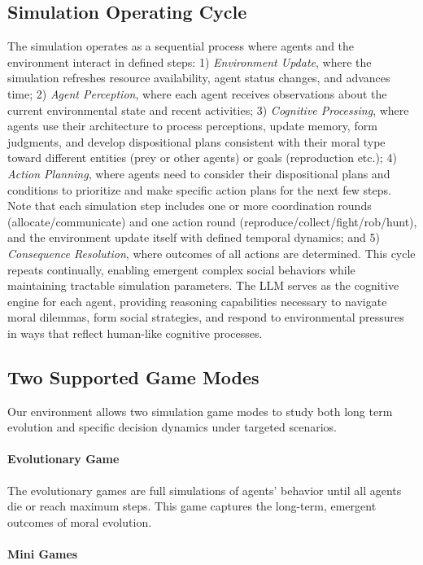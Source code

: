 \documentclass[letterpaper]{article} %
\begin{document}
\subsection{Simulation Operating Cycle} 
The simulation operates as a sequential process where agents and the environment interact in defined steps: 1) \textit{Environment Update}, where the simulation refreshes resource availability, agent status changes, and advances time; 2) \textit{Agent Perception}, where each agent receives observations about the current environmental state and recent activities; 3) \textit{Cognitive Processing}, where agents use their architecture to process perceptions, update memory, form judgments, and develop dispositional plans consistent with their moral type toward different entities (prey or other agents) or goals (reproduction etc.); 4) \textit{Action Planning}, where agents need to consider their dispositional plans and conditions to prioritize and make specific action plans for the next few steps. Note that each simulation step includes one or more coordination rounds (allocate/communicate) and one action round (reproduce/collect/fight/rob/hunt), and the environment update itself with defined temporal dynamics; and 5) \textit{Consequence Resolution}, where outcomes of all actions are determined. This cycle repeats continually, enabling emergent complex social behaviors while maintaining tractable simulation parameters. The LLM serves as the cognitive engine for each agent, providing reasoning capabilities necessary to navigate moral dilemmas, form social strategies, and respond to environmental pressures in ways that reflect human-like cognitive processes.

\subsection{Two Supported Game Modes}
Our environment allows two simulation game modes to study both long term evolution and specific decision dynamics under targeted scenarios.

\paragraph{Evolutionary Game}
The evolutionary games are full simulations of agents’ behavior until all agents die or reach maximum steps. This game captures the long-term, emergent outcomes of moral evolution.

\paragraph{Mini Games} 
\end{document}
